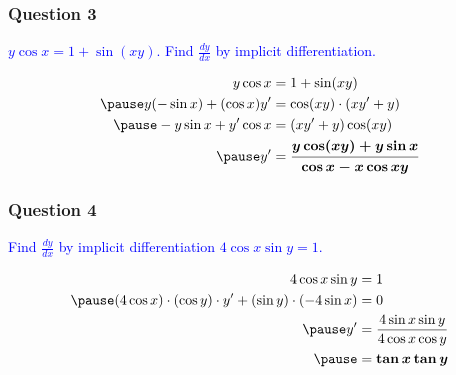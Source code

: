 \documentclass[12pt,fleqn]{beamer}
\newcommand{\question}[1]{\textcolor{blue}{#1}}
\begin{document}
\begin{frame}[t]
\frametitle{Question 3}

\question{$y\cos x=1+\sin(xy)$. Find $\frac{dy}{dx}$ by implicit differentiation.}

\[
\begin{align*}
y\cos x & =1+\sin (xy)\\\pause
y(-\sin x)+(\cos x)y' & =\cos (xy)\cdot (xy'+y)\\\pause
-y\sin x+y'\cos x & =(xy'+y)\cos (xy)\\\pause
y' & =\boldsymbol{\frac{y\cos (xy)+y\sin x}{\cos x-x\cos xy}}
\end{align*}
\]
\end{frame}

\begin{frame}[t]
\frametitle{Question 4}

\question{Find $\frac{dy}{dx}$ by implicit differentiation $4\cos x\sin y=1$.}

\[
\begin{align*}
4\cos x\sin y & =1\\\pause
(4\cos x)\cdot (\cos y)\cdot y'+(\sin y)\cdot (-4\sin x) & =0\\\pause
y' & =\frac{4\sin x\sin y}{4\cos x\cos y}\\\pause
 & =\boldsymbol{\tan x\tan y}
\end{align*}
\]
\end{frame}
\end{document}
